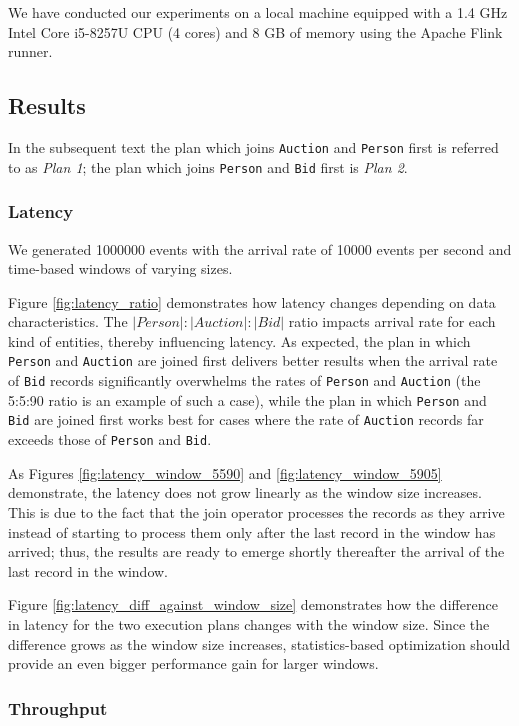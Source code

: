 We have conducted our experiments on a local machine equipped with a 1.4 GHz Intel Core i5-8257U CPU (4 cores) and 8 GB of memory using the Apache Flink runner. 

\subsection{Results}

In the subsequent text the plan which joins \texttt{Auction} and \texttt{Person} first is referred to as \textit{Plan 1}; the plan which joins \texttt{Person} and \texttt{Bid} first is \textit{Plan 2}.
\subsubsection{Latency}

We generated 1000000 events with the arrival rate of 10000 events per second and time-based windows of varying sizes.

Figure \ref{fig:latency_ratio} 
demonstrates how latency changes depending on data characteristics. The $|Person|:|Auction|:|Bid|$ ratio impacts arrival rate for each kind of entities, thereby influencing latency. As expected, the plan in which \texttt{Person} and \texttt{Auction} are joined first delivers better results when the arrival rate of \texttt{Bid} records significantly overwhelms the rates of \texttt{Person} and \texttt{Auction} (the 5:5:90 ratio is an example of such a case), while the plan in which \texttt{Person} and \texttt{Bid} are joined first works best for cases where the rate of \texttt{Auction} records far exceeds those of \texttt{Person} and \texttt{Bid}. 

As Figures \ref{fig:latency_window_5590} and \ref{fig:latency_window_5905} demonstrate, the latency does not grow linearly as the window size increases. This is due to the fact that the join operator processes the records as they arrive instead of starting to process them only after the last record in the window has arrived; thus, the results are ready to emerge shortly thereafter the arrival of the last record in the window.

Figure \ref{fig:latency_diff_against_window_size} demonstrates how the difference in latency for the two execution plans changes with the window size. Since the difference grows as the window size increases, statistics-based optimization should provide an even bigger performance gain for larger windows.

\subsubsection{Throughput}

